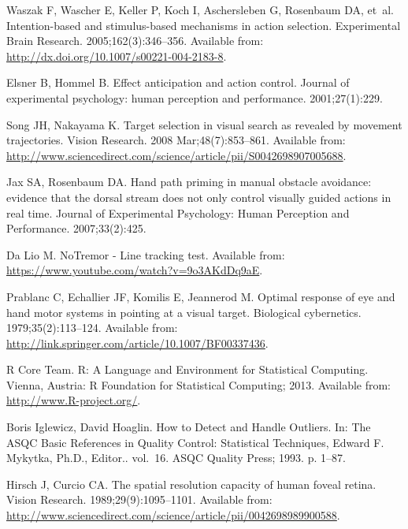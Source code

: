 \documentclass[10pt,letterpaper]{article}
\begin{document}
\begin{thebibliography}{10}
Waszak F, Wascher E, Keller P, Koch I, Aschersleben G, Rosenbaum DA, et~al.
\newblock Intention-based and stimulus-based mechanisms in action selection.
\newblock Experimental Brain Research. 2005;162(3):346--356.
\newblock Available from: \url{http://dx.doi.org/10.1007/s00221-004-2183-8}.

Elsner B, Hommel B.
\newblock Effect anticipation and action control.
\newblock Journal of experimental psychology: human perception and performance.
  2001;27(1):229.

Song JH, Nakayama K.
\newblock Target selection in visual search as revealed by movement
  trajectories.
\newblock Vision Research. 2008 Mar;48(7):853--861.
\newblock Available from:
  \url{http://www.sciencedirect.com/science/article/pii/S0042698907005688}.

Jax SA, Rosenbaum DA.
\newblock Hand path priming in manual obstacle avoidance: evidence that the
  dorsal stream does not only control visually guided actions in real time.
\newblock Journal of Experimental Psychology: Human Perception and Performance.
  2007;33(2):425.

Da Lio M.
\newblock NoTremor - Line tracking test.
\newblock Available from: \url{https://www.youtube.com/watch?v=9o3AKdDq9aE}.

Prablanc C, Echallier JF, Komilis E, Jeannerod M.
\newblock Optimal response of eye and hand motor systems in pointing at a
  visual target.
\newblock Biological cybernetics. 1979;35(2):113--124.
\newblock Available from:
  \url{http://link.springer.com/article/10.1007/BF00337436}.

{R Core Team}.
\newblock R: {A} {Language} and {Environment} for {Statistical} {Computing}.
\newblock Vienna, Austria: R Foundation for Statistical Computing; 2013.
\newblock Available from: \url{http://www.R-project.org/}.

{Boris Iglewicz}, {David Hoaglin}.
\newblock How to {Detect} and {Handle} {Outliers}.
\newblock In: The {ASQC} {Basic} {References} in {Quality} {Control}:
  {Statistical} {Techniques}, {Edward} {F}. {Mykytka}, {Ph}.{D}., {Editor}..
  vol.~16. ASQC Quality Press; 1993. p. 1--87.

Hirsch J, Curcio CA.
\newblock The spatial resolution capacity of human foveal retina.
\newblock Vision Research. 1989;29(9):1095--1101.
\newblock Available from:
  \url{http://www.sciencedirect.com/science/article/pii/0042698989900588}.


\end{thebibliography}
\end{document}
